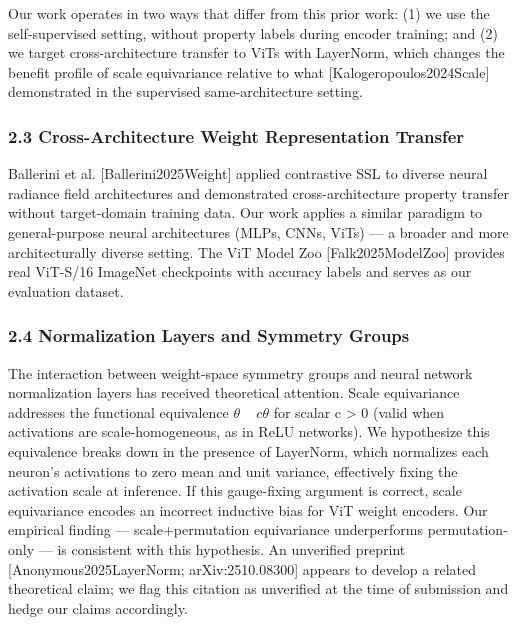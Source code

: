 Our work operates in two ways that differ from this prior work: (1) we use the self-supervised setting, without property labels during encoder training; and (2) we target cross-architecture transfer to ViTs with LayerNorm, which changes the benefit profile of scale equivariance relative to what [Kalogeropoulos2024Scale] demonstrated in the supervised same-architecture setting.

\subsubsection{2.3 Cross-Architecture Weight Representation Transfer}

Ballerini et al. [Ballerini2025Weight] applied contrastive SSL to diverse neural radiance field architectures and demonstrated cross-architecture property transfer without target-domain training data. Our work applies a similar paradigm to general-purpose neural architectures (MLPs, CNNs, ViTs) --- a broader and more architecturally diverse setting. The ViT Model Zoo [Falk2025ModelZoo] provides real ViT-S/16 ImageNet checkpoints with accuracy labels and serves as our evaluation dataset.

\subsubsection{2.4 Normalization Layers and Symmetry Groups}

The interaction between weight-space symmetry groups and neural network normalization layers has received theoretical attention. Scale equivariance addresses the functional equivalence $\theta$ ~ $c\theta$ for scalar c > 0 (valid when activations are scale-homogeneous, as in ReLU networks). We hypothesize this equivalence breaks down in the presence of LayerNorm, which normalizes each neuron's activations to zero mean and unit variance, effectively fixing the activation scale at inference. If this gauge-fixing argument is correct, scale equivariance encodes an incorrect inductive bias for ViT weight encoders. Our empirical finding --- scale+permutation equivariance underperforms permutation-only --- is consistent with this hypothesis. An unverified preprint [Anonymous2025LayerNorm; arXiv:2510.08300] appears to develop a related theoretical claim; we flag this citation as unverified at the time of submission and hedge our claims accordingly.

